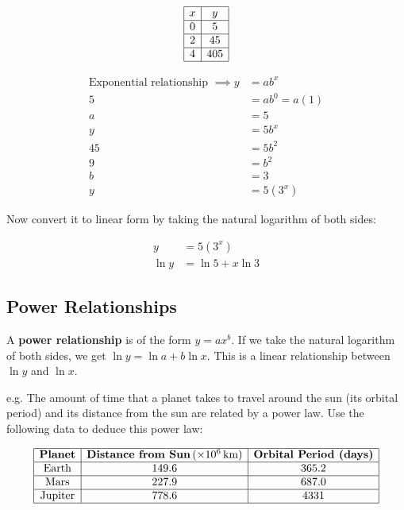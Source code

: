 $$ \begin{array}{|c|c|} \hline x & y \\ \hline 0 & 5 \\ \hline 2 & 45 \\ \hline 4 & 405 \\ \hline \end{array} $$



\begin{align} \text{Exponential relationship } \implies y & = ab^x \\ 5 & = ab^0 = a(1) \\ a & = 5 \\ y & = 5b^x \\ 45 & = 5b^2 \\ 9 & = b^2 \\ b & = 3 \\ y & = 5(3^x) \end{align}



Now convert it to linear form by taking the natural logarithm of both sides:



\begin{align} y & = 5(3^x) \\ \ln y & = \ln 5 + x \ln 3 \end{align}




\subsection{Power Relationships}
\label{sss:powe-d92b}




A \textbf{power relationship} is of the form $y = ax^b$. If we take the natural logarithm
of both sides, we get $\ln y = \ln a + b \ln x$. This is a linear relationship between
$\ln y$ and $\ln x$.



e.g. The amount of time that a planet takes to travel around the sun (its orbital period)
and its distance from the sun are related by a power law. Use the following data to deduce
this power law:



$$ \begin{array}{|c|c|c|} \hline \textbf{Planet} & \textbf{Distance from Sun} \,(\times 10^6 \, \text{km}) & \textbf{Orbital Period (days)} \\ \hline \text{Earth} & 149.6 & 365.2 \\ \hline \text{Mars} & 227.9 & 687.0 \\ \hline \text{Jupiter} & 778.6 & 4331 \\ \hline \end{array} $$



